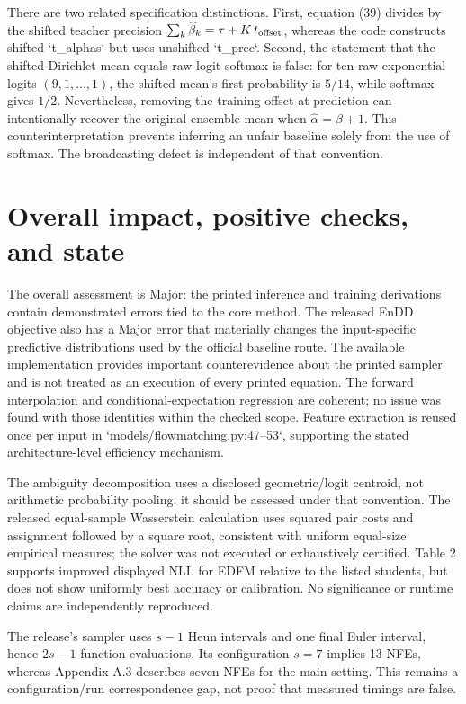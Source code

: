 \documentclass[10pt]{article}
\begin{document}
There are two related specification distinctions. First, equation (39) divides by the shifted teacher precision \(\sum_k\widehat\beta_k=\tau+K\,t_{\rm offset}\), whereas the code constructs shifted `t\_alphas` but uses unshifted `t\_prec`. Second, the statement that the shifted Dirichlet mean equals raw-logit softmax is false: for ten raw exponential logits \((9,1,\ldots,1)\), the shifted mean’s first probability is \(5/14\), while softmax gives \(1/2\). Nevertheless, removing the training offset at prediction can intentionally recover the original ensemble mean when \(\widehat\alpha=\beta+1\). This counterinterpretation prevents inferring an unfair baseline solely from the use of softmax. The broadcasting defect is independent of that convention.\par
\section*{Overall impact, positive checks, and state}
The overall assessment is Major: the printed inference and training derivations contain demonstrated errors tied to the core method. The released EnDD objective also has a Major error that materially changes the input-specific predictive distributions used by the official baseline route. The available implementation provides important counterevidence about the printed sampler and is not treated as an execution of every printed equation. The forward interpolation and conditional-expectation regression are coherent; no issue was found with those identities within the checked scope. Feature extraction is reused once per input in `models/flowmatching.py:47--53`, supporting the stated architecture-level efficiency mechanism.\par
The ambiguity decomposition uses a disclosed geometric/logit centroid, not arithmetic probability pooling; it should be assessed under that convention. The released equal-sample Wasserstein calculation uses squared pair costs and assignment followed by a square root, consistent with uniform equal-size empirical measures; the solver was not executed or exhaustively certified. Table 2 supports improved displayed NLL for EDFM relative to the listed students, but does not show uniformly best accuracy or calibration. No significance or runtime claims are independently reproduced.\par
The release’s sampler uses \(s-1\) Heun intervals and one final Euler interval, hence \(2s-1\) function evaluations. Its configuration \(s=7\) implies 13 NFEs, whereas Appendix A.3 describes seven NFEs for the main setting. This remains a configuration/run correspondence gap, not proof that measured timings are false.\par
\end{document}
